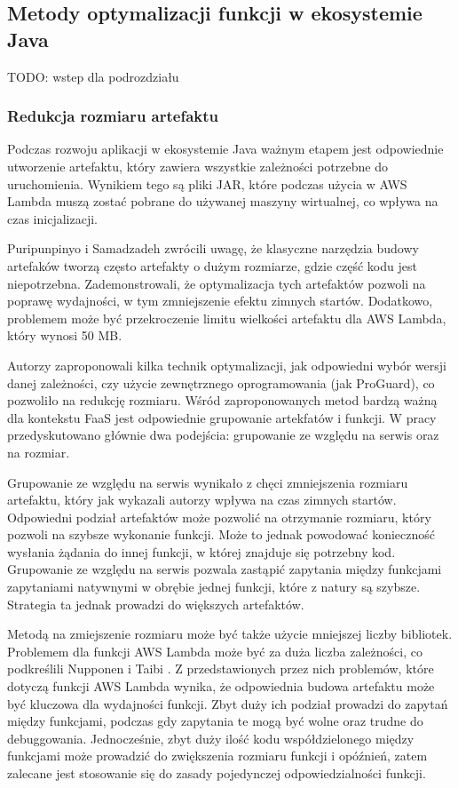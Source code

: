 \subsection{Metody optymalizacji funkcji w ekosystemie Java}\label{chapter:przeglad_literatury_wyniki_metody}

TODO: wstep dla podrozdziału

\subsubsection*{Redukcja rozmiaru artefaktu}\label{chapter:przeglad_literatury_wyniki_redukcja_rozmiaru}

Podczas rozwoju aplikacji w ekosystemie Java ważnym etapem jest odpowiednie utworzenie artefaktu, który zawiera wszystkie zależności potrzebne do uruchomienia.
Wynikiem tego są pliki JAR, które podczas użycia w AWS Lambda muszą zostać pobrane do używanej maszyny wirtualnej, co wpływa na czas inicjalizacji.

Puripunpinyo i Samadzadeh \cite{8116416} zwrócili uwagę, że klasyczne narzędzia budowy artefaków tworzą często artefakty o dużym rozmiarze, gdzie część kodu jest niepotrzebna.
Zademonstrowali, że optymalizacja tych artefaktów pozwoli na poprawę wydajności, w tym zmniejszenie efektu zimnych startów. 
Dodatkowo, problemem może być przekroczenie limitu wielkości artefaktu dla AWS Lambda, który wynosi 50 MB.

Autorzy zaproponowali kilka technik optymalizacji, jak odpowiedni wybór wersji danej zależności, czy użycie zewnętrznego oprogramowania (jak ProGuard), co pozwoliło na redukcję rozmiaru.
Wśród zaproponowanych metod bardzą ważną dla kontekstu FaaS jest odpowiednie grupowanie artekfatów i funkcji. W pracy przedyskutowano głównie dwa podejścia: grupowanie ze względu na serwis oraz na rozmiar.

Grupowanie ze względu na serwis wynikało z chęci zmniejszenia rozmiaru artefaktu, który jak wykazali autorzy wpływa na czas zimnych startów. 
Odpowiedni podział artefaktów może pozwolić na otrzymanie rozmiaru, który pozwoli na szybsze wykonanie funkcji. Może to jednak powodować konieczność wysłania żądania do innej funkcji, w której znajduje się potrzebny kod.
Grupowanie ze względu na serwis pozwala zastąpić zapytania między funkcjami zapytaniami natywnymi w obrębie jednej funkcji, które z natury są szybsze. Strategia ta jednak prowadzi do większych artefaktów.

Metodą na zmiejszenie rozmiaru może być także użycie mniejszej liczby bibliotek. Problemem dla funkcji AWS Lambda może być za duża liczba zależności, co podkreślili Nupponen i Taibi \cite{9095731}.
Z przedstawionych przez nich problemów, które dotyczą funkcji AWS Lambda wynika, że odpowiednia budowa artefaktu może być kluczowa dla wydajności funkcji. 
Zbyt duży ich podział prowadzi do zapytań między funkcjami, podczas gdy zapytania te mogą być wolne oraz trudne do debuggowania. 
Jednocześnie, zbyt duży ilość kodu współdzielonego między funkcjami może prowadzić do zwiększenia rozmiaru funkcji i opóźnień, zatem zalecane jest stosowanie się do zasady pojedynczej odpowiedzialności funkcji. 

